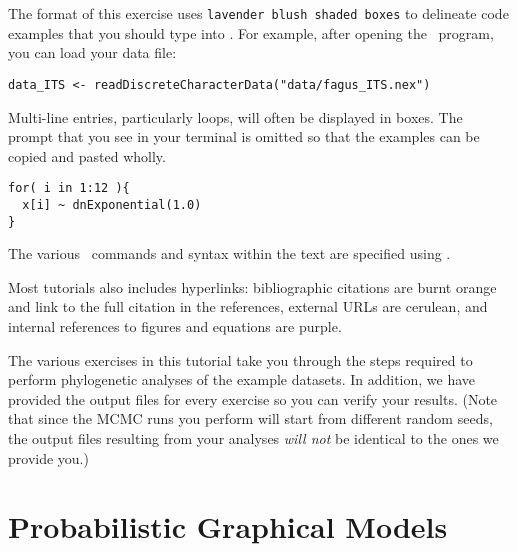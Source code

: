 The format of this exercise uses \colorbox{shadecolor}{\tt lavender blush shaded boxes} to delineate code examples that you should type into \RevBayes. 
For example, after opening the \RevBayes~program, you can load your data file:
{\tt \begin{snugshade*}
\begin{lstlisting}
data_ITS <- readDiscreteCharacterData("data/fagus_ITS.nex")
\end{lstlisting}
\end{snugshade*}}

Multi-line entries, particularly loops, will often be displayed in boxes.
The  prompt that you see in your terminal is omitted so that the examples can be copied and pasted wholly. 
{\tt \begin{snugshade*}
\begin{lstlisting}
for( i in 1:12 ){
  x[i] ~ dnExponential(1.0)
}
\end{lstlisting}
\end{snugshade*}}

The various \RevBayes~commands and syntax within the text are specified using . 

Most tutorials also includes hyperlinks: bibliographic citations are {\textcolor{citescol}{burnt orange}} and link to the full citation in the references, external URLs are {\textcolor{urlscol}{cerulean}}, and internal references to figures and equations are {\textcolor{linkscol}{purple}}.

The various exercises in this tutorial take you through the steps required to perform phylogenetic analyses of the example datasets. 
In addition, we have provided the output files for every exercise so you can verify your results. (Note that since the MCMC runs you perform will start from different random seeds, the output files resulting from your analyses \textit{will not} be identical to the ones we provide you.)


\bigskip
\section{Probabilistic Graphical Models}

